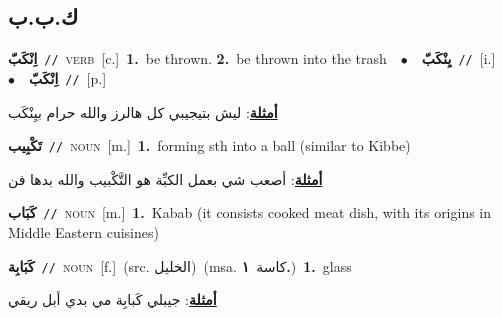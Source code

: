 \documentclass[10pt,a4paper,twoside]{article} %
\begin{document}
\begin{multicols}{2}
{{{{\vspace{-3mm}
\subsection*{\color{blue}\foreignlanguage{arabic}{ك.ب.ب}\color{blue}{}} 

{\setlength\topsep{0pt}\textbf{\foreignlanguage{arabic}{اِنْكَبّ}}\ {\color{gray}\texttt{//}\color{black}}\ \textsc{verb}\ [c.]\ \textbf{1.}~be thrown.  \textbf{2.}~be thrown into the trash\ \ $\bullet$\ \ \setlength\topsep{0pt}\textbf{\foreignlanguage{arabic}{يِنْكَبّ}}\ {\color{gray}\texttt{//}\color{black}}\ [i.]\ \ $\bullet$\ \ \setlength\topsep{0pt}\textbf{\foreignlanguage{arabic}{اِنْكَبّ}}\ {\color{gray}\texttt{//}\color{black}}\ [p.]\  \begin{flushright}\color{gray}\foreignlanguage{arabic}{\textbf{\underline{\foreignlanguage{arabic}{أمثلة}}}: ليش بتيجيبي كل هالرز والله حرام بيِنْكَب}\end{flushright}\color{black}} \vspace{2mm}

{\setlength\topsep{0pt}\textbf{\foreignlanguage{arabic}{تَكْبِيب}}\ {\color{gray}\texttt{//}\color{black}}\ \textsc{noun}\ [m.]\ \textbf{1.}~forming sth into a ball (similar to Kibbe)\  \begin{flushright}\color{gray}\foreignlanguage{arabic}{\textbf{\underline{\foreignlanguage{arabic}{أمثلة}}}: أصعب شي بعمل الكبِّة هو التَّكْبيب والله بدها فن}\end{flushright}\color{black}} \vspace{2mm}

{\setlength\topsep{0pt}\textbf{\foreignlanguage{arabic}{كَبَاب}}\ {\color{gray}\texttt{//}\color{black}}\ \textsc{noun}\ [m.]\ \textbf{1.}~Kabab (it consists cooked meat dish, with its origins in Middle Eastern cuisines)\ 

{\setlength\topsep{0pt}\textbf{\foreignlanguage{arabic}{كَبَابِة}}\ {\color{gray}\texttt{//}\color{black}}\ \textsc{noun}\ [f.]\ (src. \color{gray}\foreignlanguage{arabic}{الخليل}\color{black})\ \color{gray}(msa. \foreignlanguage{arabic}{كاسة}~\foreignlanguage{arabic}{\textbf{١.}})\color{black}\ \textbf{1.}~glass\  \begin{flushright}\color{gray}\foreignlanguage{arabic}{\textbf{\underline{\foreignlanguage{arabic}{أمثلة}}}: جيبلي كَبابِة مي بدي أبل ريقي}\end{flushright}\color{black}} \vspace{2mm}

}}}}}
\end{multicols}
\end{document}
